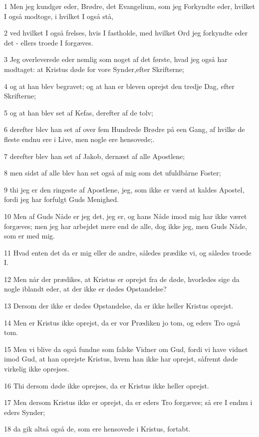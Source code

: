 \par 1 Men jeg kundgør eder, Brødre, det Evangelium, som jeg Forkyndte eder, hvilket I også modtoge, i hvilket I også stå,
\par 2 ved hvilket I også frelses, hvis I fastholde, med hvilket Ord jeg forkyndte eder det - ellers troede I forgæves.
\par 3 Jeg overleverede eder nemlig som noget af det første, hvad jeg også har modtaget: at Kristus døde for vore Synder,efter Skrifterne;
\par 4 og at han blev begravet; og at han er bleven oprejst den tredje Dag, efter Skrifterne;
\par 5 og at han blev set af Kefas, derefter af de tolv;
\par 6 derefter blev han set af over fem Hundrede Brødre på een Gang, af hvilke de fleste endnu ere i Live, men nogle ere hensovede;.
\par 7 derefter blev han set af Jakob, dernæst af alle Apostlene;
\par 8 men sidst af alle blev han set også af mig som det ufuldbårne Foster;
\par 9 thi jeg er den ringeste af Apostlene, jeg, som ikke er værd at kaldes Apostel, fordi jeg har forfulgt Guds Menighed.
\par 10 Men af Guds Nåde er jeg det, jeg er, og hans Nåde imod mig har ikke været forgæves; men jeg har arbejdet mere end de alle, dog ikke jeg, men Guds Nåde, som er med mig.
\par 11 Hvad enten det da er mig eller de andre, således prædike vi, og således troede I.
\par 12 Men når der prædikes, at Kristus er oprejst fra de døde, hvorledes sige da nogle iblandt eder, at der ikke er dødes Opstandelse?
\par 13 Dersom der ikke er dødes Opstandelse, da er ikke heller Kristus oprejst.
\par 14 Men er Kristus ikke oprejst, da er vor Prædiken jo tom, og eders Tro også tom.
\par 15 Men vi blive da også fundne som falske Vidner om Gud, fordi vi have vidnet imod Gud, at han oprejste Kristus, hvem han ikke har oprejst, såfremt døde virkelig ikke oprejses.
\par 16 Thi dersom døde ikke oprejses, da er Kristus ikke heller oprejst.
\par 17 Men dersom Kristus ikke er oprejst, da er eders Tro forgæves; så ere I endnu i eders Synder;
\par 18 da gik altså også de, som ere hensovede i Kristus, fortabt.

